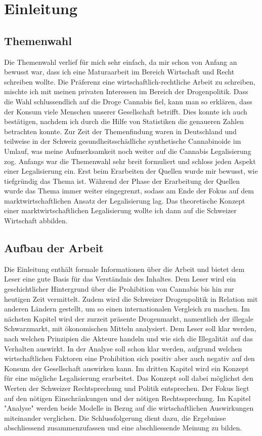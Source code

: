 \documentclass[../main.tex]{subfiles}
\begin{document}
	 \section{Einleitung}
	 
	 \subsection{Themenwahl}
	 Die Themenwahl verlief für mich sehr einfach, da mir schon von Anfang an bewusst war, dass ich eine Maturaarbeit im Bereich Wirtschaft und Recht schreiben wollte. 
	 Die Präferenz eine wirtschaftlich-rechtliche Arbeit zu schreiben, mischte ich mit meinen privaten Interessen im Bereich der Drogenpolitik. 
	 Dass die Wahl schlussendlich auf die Droge Cannabis fiel, kann man so erklären, dass der Konsum viele Menschen unserer Gesellschaft betrifft. 
	 Dies konnte ich auch bestätigen, nachdem ich durch die Hilfe von Statistiken die genaueren Zahlen betrachten konnte. 
	 Zur Zeit der Themenfindung waren in Deutschland und teilweise in der Schweiz gesundheitsschädliche synthetische Cannabinoide im Umlauf, was meine Aufmerksamkeit noch weiter auf die Cannabis Legalisierung zog.
	 Anfangs war die Themenwahl sehr breit formuliert und schloss jeden Aspekt einer Legalisierung ein. 
	 Erst beim Erarbeiten der Quellen wurde mir bewusst, wie tiefgründig das Thema ist. 
	 Während der Phase der Erarbeitung der Quellen wurde das Thema immer weiter eingegrenzt, sodass am Ende der Fokus auf dem marktwirtschaftlichen Ansatz der Legalisierung lag. 
	 Das theoretische Konzept einer marktwirtschaftlichen Legalisierung wollte ich dann auf die Schweizer Wirtschaft abbilden.
	 
	 \subsection{Aufbau der Arbeit}
	 Die Einleitung enthält formale Informationen über die Arbeit und bietet dem Leser eine gute Basis für das Verständnis des Inhaltes. 
	 Dem Leser wird ein geschichtlicher Hintergrund über die Prohibition von Cannabis bis hin zur heutigen Zeit vermittelt. 
	 Zudem wird die Schweizer Drogenpolitik in Relation mit anderen Ländern gestellt, um so einen internationalen Vergleich zu machen.
	 Im nächsten Kapitel wird der zurzeit präsente Drogenmarkt, namentlich der illegale Schwarzmarkt, mit ökonomischen Mitteln analysiert. 
	 Dem Leser soll klar werden, nach welchen Prinzipien die Akteure handeln und wie sich die Illegalität auf das Verhalten auswirkt.
	 In der Analyse soll schon klar werden, aufgrund welchen wirtschaftlichen Faktoren eine Prohibition sich positiv aber auch negativ auf den Konsum der Gesellschaft auswirken kann. 
	 Im dritten Kapitel wird ein Konzept für eine mögliche Legalisierung erarbeitet. 
	 Das Konzept soll dabei möglichst den Werten der Schweizer Rechtsprechung und Politik entsprechen. 
	 Der Fokus liegt auf den nötigen Einschränkungen und der nötigen Rechtssprechung.
	 Im Kapitel "Analyse" werden beide Modelle in Bezug auf die wirtschaftlichen Auswirkungen miteinander verglichen. 
	 Die Schlussfolgerung dient dazu, die Ergebnisse abschliessend zusammenzufassen und eine abschliessende Meinung zu bilden.
	 
\end{document}
